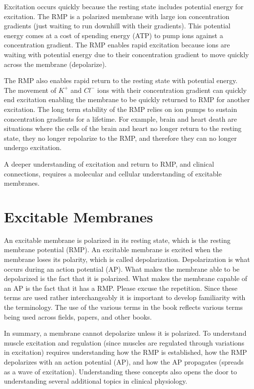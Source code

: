 \vspace{0.2cm}
Excitation occurs quickly because the resting state includes potential energy for excitation. The RMP is a polarized membrane with large ion concentration gradients (just waiting to run downhill with their gradients). This potential energy comes at a cost of spending energy (ATP) to pump ions against a concentration gradient. The RMP enables rapid excitation because ions are waiting with potential energy due to their concentration gradient to move quickly across the membrane (depolarize). 

\vspace{0.2cm}
The RMP also enables rapid return to the resting state with potential energy. The movement of $K^+$ and $Cl^-$ ions with their concentration gradient can quickly end excitation enabling the membrane to be quickly returned to RMP for another excitation. The long term stability of the RMP relies on ion pumps to sustain concentration gradients for a lifetime. For example, brain and heart death are situations where the cells of the brain and heart no longer return to the resting state, they no longer repolarize to the RMP, and therefore they can no longer undergo excitation.

A deeper understanding of excitation and return to RMP, and clinical connections, requires a molecular and cellular understanding of excitable membranes.


\section{Excitable Membranes}

An excitable membrane is polarized in its resting state, which is the resting membrane potential (RMP). An excitable membrane is excited when the membrane loses its polarity, which is called depolarization. Depolarization is what occurs during an action potential (AP). What makes the membrane able to be depolarized is the fact that it is polarized. What makes the membrane capable of an AP is the fact that it has a RMP. Please excuse the repetition. Since these terms are used rather interchangeably it is important to develop familiarity with the terminology. The use of the various terms in the book reflects various terms being used across fields, papers, and other books.

In summary, a membrane cannot depolarize unless it is polarized. To understand muscle excitation and regulation (since muscles are regulated through variations in excitation) requires understanding how the RMP is established, how the RMP depolarizes with an action potential (AP), and how the AP propagates (spreads as a wave of excitation). Understanding these concepts also opens the door to understanding several additional topics in clinical physiology. 

